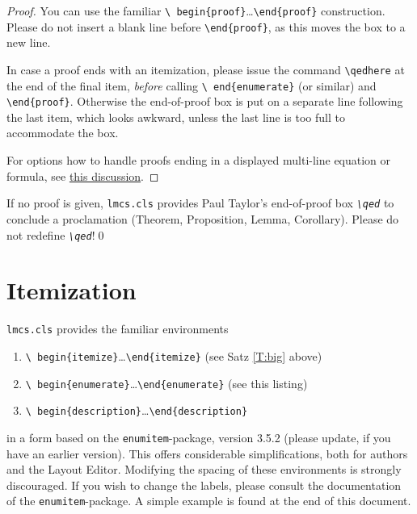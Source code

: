 \documentclass{lmcs} %
\theoremstyle{plain}\newtheorem{satz}[thm]{Satz} %
\begin{document}
\begin{proof} You can use the familiar \texttt{\textbackslash
    begin\{proof\}}\dots\texttt{\textbackslash end\{proof\}}
  construction.  Please do not insert a blank line before
  \texttt{\textbackslash end\{proof\}}, as this moves the box to a new
  line.

  In case a proof ends with an itemization,
  please issue the command \texttt{\textbackslash qedhere} at the end
  of the final item, \emph{before} calling \texttt{\textbackslash
    end\{enumerate\}} (or similar) and \texttt{\textbackslash end\{proof\}}.
  Otherwise the end-of-proof box is put on a separate line
  following the last item, which looks awkward, unless the last line
  is too full to accommodate the box.

  For options how to handle proofs ending in a displayed multi-line
  equation or formula, see
  \href{http://tex.stackexchange.com/questions/101929/qed-or-qedhere-at-the-end-of-split-environment}{this
    discussion}.
\end{proof}

\begin{cor}\label{C:big}
  If no proof is given, \texttt{lmcs.cls} provides Paul Taylor's
  end-of-proof box \emph{\texttt{\textbackslash qed}} to conclude a
  proclamation (Theorem, Proposition, Lemma, Corollary).  Please do
  not redefine \emph{\texttt{\textbackslash qed}}!\qed
\end{cor}

\section{Itemization}\label{S:item}
  \texttt{lmcs.cls} provides the familiar environments
\begin{enumerate}
\item\texttt{\textbackslash
  begin\{itemize\}}\dots\texttt{\textbackslash end\{itemize\}} (see
 Satz \ref{T:big} above)
\item\texttt{\textbackslash
  begin\{enumerate\}}\dots\texttt{\textbackslash end\{enumerate\}}
  (see this listing)
\item\texttt{\textbackslash
    begin\{description\}}\dots\texttt{\textbackslash end\{description\}}
\end{enumerate}
  in a form based on the \texttt{enumitem}-package, version 3.5.2
  (please update, if you have an earlier version).  This offers
  considerable simplifications, both for authors and the Layout
  Editor.  Modifying the spacing of these environments is strongly
  discouraged.  If you wish to change the labels, please consult the
  documentation of the \texttt{enumitem}-package.  A simple example is
  found at the end of this document.
\end{document}
